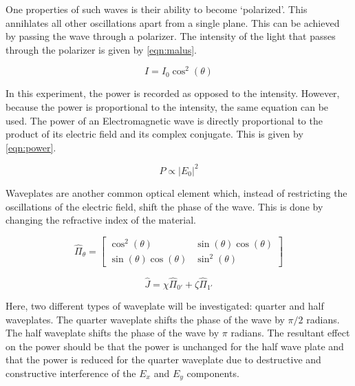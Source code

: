 \documentclass[aip, cp, amsmath, amssymb, reprint]{revtex4-2}
\begin{document}
        One properties of such waves is their ability to become `polarized'. This annihlates all other oscillations apart from a single plane. This can be achieved by passing the wave through a polarizer. The intensity of the light that passes through the polarizer is given by \eqref{eqn:malus}. 

        \begin{equation} \label{eqn:malus}
            I = I_0 \cos^2(\theta)
        \end{equation}

        In this experiment, the power is recorded as opposed to the intensity. However, because the power is proportional to the intensity, the same equation can be used. The power of an Electromagnetic wave is directly proportional to the product of its electric field and its complex conjugate. This is given by \eqref{eqn:power}. 

        \begin{equation} \label{eqn:power}
            P \propto |E_0|^2
        \end{equation}

        Waveplates are another common optical element which, instead of restricting the oscillations of the electric field, shift the phase of the wave. This is done by changing the refractive index of the material.
        
        \begin{equation} \label{eqn:generalized-polarizer}
            \hat{\Pi}_{\theta} = \begin{bmatrix} \cos^2(\theta) & \sin(\theta)\cos(\theta) \\ \sin(\theta)\cos(\theta) & \sin^2(\theta)\end{bmatrix}
        \end{equation}

        \begin{equation} \label{eqn:jones-mat}
            \hat{J} = \chi\hat{\Pi}_{0'} + \zeta\hat{\Pi}_{1'}
        \end{equation}

        Here, two different types of waveplate will be investigated: quarter and half waveplates. The quarter waveplate shifts the phase of the wave by $\pi/2$ radians. The half waveplate shifts the phase of the wave by $\pi$ radians. The resultant effect on the power should be that the power is unchanged for the half wave plate and that the power is reduced for the quarter waveplate due to destructive and constructive interference of the $E_x$ and $E_y$ components.
\end{document}
